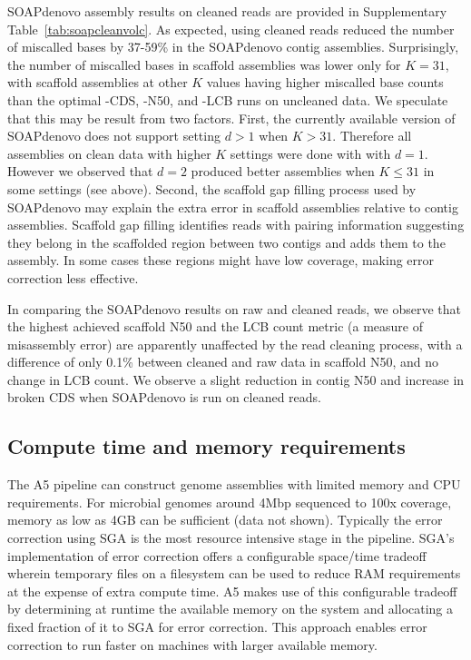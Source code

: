 \documentclass[10pt]{article}
\begin{document}
SOAPdenovo assembly results on cleaned reads are provided in Supplementary Table~\ref{tab:soapcleanvolc}. 
As expected, using cleaned reads reduced the number of miscalled bases by 37-59\% in the SOAPdenovo contig assemblies.
Surprisingly, the number of miscalled bases in scaffold assemblies was lower only for $K=31$, with scaffold assemblies at other $K$ values having higher miscalled base counts than the optimal -CDS, -N50, and -LCB runs on uncleaned data.
We speculate that this may be result from two factors. First, the currently available version of SOAPdenovo does not support setting $d>1$ when $K>31$. Therefore all assemblies on clean data with higher $K$ settings were done with with $d=1$. However we observed that $d=2$ produced better assemblies when $K \le 31$ in some settings (see above). Second, the scaffold gap filling process used by SOAPdenovo may explain the extra error in scaffold assemblies relative to contig assemblies. Scaffold gap filling identifies reads with pairing information suggesting they belong in the scaffolded region between two contigs and adds them to the assembly. In some cases these regions might have low coverage, making error correction less effective.

In comparing the SOAPdenovo results on raw and cleaned reads, we observe that the highest achieved scaffold N50 and the LCB count metric (a measure of misassembly error) are apparently unaffected by the read cleaning process, with a difference of only 0.1\% between cleaned and raw data in scaffold N50, and no change in LCB count.  We observe a slight reduction in contig N50 and increase in broken CDS when SOAPdenovo is run on cleaned reads.

\subsection*{Compute time and memory requirements}

The A5 pipeline can construct genome assemblies with limited memory and CPU requirements. 
For microbial genomes around 4Mbp sequenced to 100x coverage, memory as low as 4GB can be sufficient (data not shown). 
Typically the error correction using SGA is the most resource intensive stage in the pipeline. 
SGA's implementation of error correction offers a configurable space/time tradeoff wherein temporary files on a filesystem can be used to reduce RAM requirements at the expense of extra compute time. 
A5 makes use of this configurable tradeoff by determining at runtime the available memory on the system and allocating a fixed fraction of it to SGA for error correction.
This approach enables error correction to run faster on machines with larger available memory.
\end{document}
